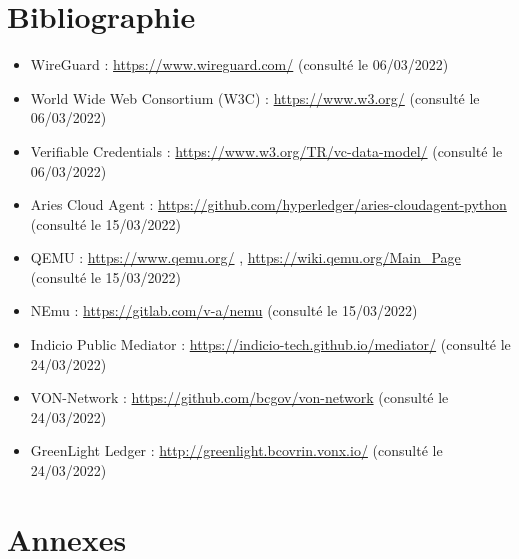 \documentclass[12pt, openany]{report}
\begin{document}
\section{Bibliographie}
\noindent 
\begin{itemize}

\item WireGuard : \url{https://www.wireguard.com/} (consulté le 06/03/2022) 
\item World Wide Web Consortium (W3C) : \url{https://www.w3.org/} (consulté le 06/03/2022)
\item Verifiable Credentials : \url{https://www.w3.org/TR/vc-data-model/} (consulté le 06/03/2022) 
\item Aries Cloud Agent : \url{https://github.com/hyperledger/aries-cloudagent-python} (consulté le 15/03/2022)
\item QEMU : \url{https://www.qemu.org/} , \url{https://wiki.qemu.org/Main_Page} (consulté le 15/03/2022)
\item NEmu : \url{https://gitlab.com/v-a/nemu} (consulté le 15/03/2022)
\item Indicio Public Mediator : \url{https://indicio-tech.github.io/mediator/} (consulté le 24/03/2022)
\item VON-Network : \url{https://github.com/bcgov/von-network} (consulté le 24/03/2022)
\item GreenLight Ledger : \url{http://greenlight.bcovrin.vonx.io/} (consulté le 24/03/2022)
\end{itemize}

\newpage

\section{Annexes}
\noindent 
\end{document}
